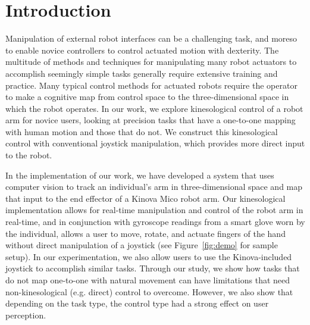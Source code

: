 \documentclass{sigchi}
\begin{document}


\section{Introduction}

Manipulation of external robot interfaces can be a challenging task, and moreso to enable novice controllers to control actuated motion with dexterity.  The multitude of methods and techniques for manipulating many robot actuators to accomplish seemingly simple tasks generally require extensive training and practice.  Many typical control methods for actuated robots require the operator to make a cognitive map from control space to the three-dimensional space in which the robot operates.  In our work, we explore kinesological control of a robot arm for novice users, looking at precision tasks that have a one-to-one mapping with human motion and those that do not.  We construct this kinesological control with conventional joystick manipulation, which provides more direct input to the robot.  

In the implementation of our work, we have developed a system that uses computer vision to track an individual's arm in three-dimensional space and map that input to the end effector of a Kinova Mico robot arm.  Our kinesological implementation allows for real-time manipulation and control of the robot arm in real-time, and in conjunction with gyroscope readings from a smart glove worn by the individual, allows a user to move, rotate, and actuate fingers of the hand without direct manipulation of a joystick (see Figure~\ref{fig:demo} for sample setup). In our experimentation, we also allow users to use the Kinova-included joystick to accomplish similar tasks. Through our study, we show how tasks that do not map one-to-one with natural movement can have limitations that need non-kinesological (e.g. direct) control to overcome.  However, we also show that depending on the task type, the control type had a strong effect on user perception.
\end{document}
